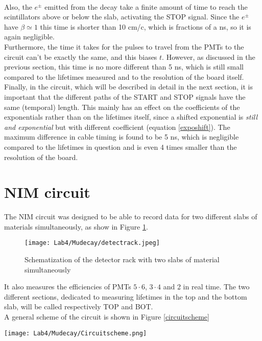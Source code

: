 \documentclass[10pt,a4paper,twocolumn]{article}
\begin{document}
\\
Also, the $e^\pm$ emitted from the decay take a finite amount of time to reach the scintillators above or below the slab, activating the STOP signal. Since the $e^\pm$ have $\beta \simeq 1$  this time is shorter than 10 cm/c, which is fractions of a ns, so it is again negligible.
\\
Furthermore, the time it takes for the pulses to travel from the PMTs to the circuit can't be exactly the same, and this biases $t$. However, as discussed in the previous section, this time is no more different than 5 ns, which is still small compared to the lifetimes measured and to the resolution of the board itself.
\\
Finally, in the circuit, which will be described in detail in the next section, it is important that the different paths of the START and STOP signals have the same (temporal) length. This mainly has an effect on the coefficients of the exponentials rather than on the lifetimes itself, since a shifted exponential is \textit{still and exponential} but with different coefficient (equation \ref{exposhift}). The maximum difference in cable timing is found to be 5 ns, which is negligible compared to the lifetimes in question and is even 4 times smaller than the resolution of the board.


\section{NIM circuit}

The NIM circuit was designed to be able to record data for two different slabs of materials simultaneously, as show in Figure \ref{detectwslabs}.

\begin{figure}[h!]
\centering
\texttt{[image: Lab4/Mudecay/detectrack.jpeg]} 
\caption{Schematization of the detector rack with two slabs of material simultaneously}
\label{detectwslabs}
\end{figure}


It also measures the efficiencies of PMTs $5\cdot 6$, $3\cdot 4$ and 2 in real time. The two different sections, dedicated to measuring lifetimes in the top and the bottom slab, will be called respectively TOP and BOT. 
\\
A general scheme of the circuit is shown in Figure \ref{circuitscheme}

\begin{figure*}[h!]
\centering
\texttt{[image: Lab4/Mudecay/Circuitscheme.png]} 
\caption{Schematization of the NIM circuit employed}
\label{circuitscheme}
\end{figure*}
\end{document}
